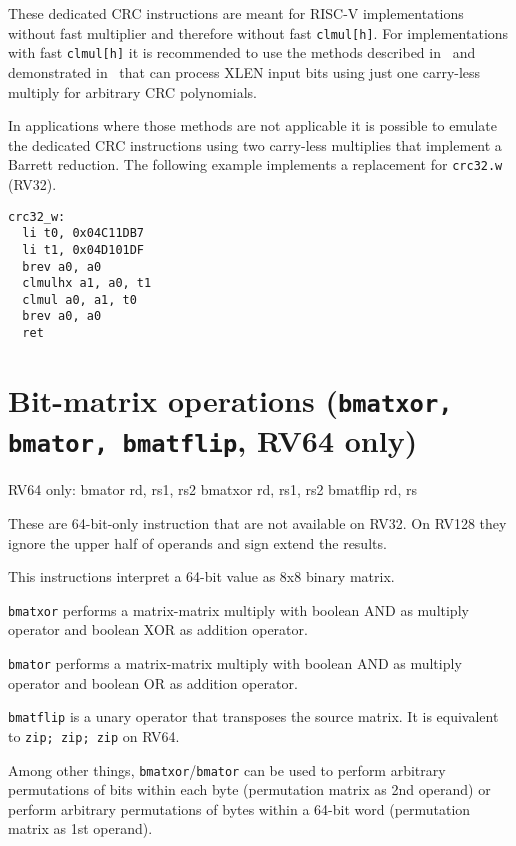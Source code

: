 These dedicated CRC instructions are meant for RISC-V implementations without fast multiplier
and therefore without fast \texttt{clmul[h]}. For implementations with fast \texttt{clmul[h]}
it is recommended to use the methods described in~\cite{FastCRC} and demonstrated in~\cite{Wolf18A}
that can process XLEN input bits using just one carry-less multiply for arbitrary CRC polynomials.

In applications where those methods are not applicable it is possible to emulate the dedicated CRC
instructions using two carry-less multiplies that implement a Barrett reduction. The following example
implements a replacement for \texttt{crc32.w} (RV32).

\begin{minipage}{\linewidth}
\begin{verbatim}
crc32_w:
  li t0, 0x04C11DB7
  li t1, 0x04D101DF
  brev a0, a0
  clmulhx a1, a0, t1
  clmul a0, a1, t0
  brev a0, a0
  ret
\end{verbatim}
\end{minipage}


\section{Bit-matrix operations (\texttt{bmatxor, bmator, bmatflip}, RV64 only)}

\begin{rvb}
  RV64 only:
    bmator rd, rs1, rs2
    bmatxor rd, rs1, rs2
    bmatflip rd, rs
\end{rvb}

These are 64-bit-only instruction that are not available on RV32. On RV128 they
ignore the upper half of operands and sign extend the results.

This instructions interpret a 64-bit value as 8x8 binary matrix.

\texttt{bmatxor} performs a matrix-matrix multiply with boolean AND as multiply
operator and boolean XOR as addition operator.

\texttt{bmator} performs a matrix-matrix multiply with boolean AND as multiply
operator and boolean OR as addition operator.

\texttt{bmatflip} is a unary operator that transposes the source matrix. It is
equivalent to \texttt{zip; zip; zip} on RV64.

Among other things, \texttt{bmatxor}/\texttt{bmator} can be used to perform
arbitrary permutations of bits within each byte (permutation matrix as 2nd
operand) or perform arbitrary permutations of bytes within a 64-bit word
(permutation matrix as 1st operand).

